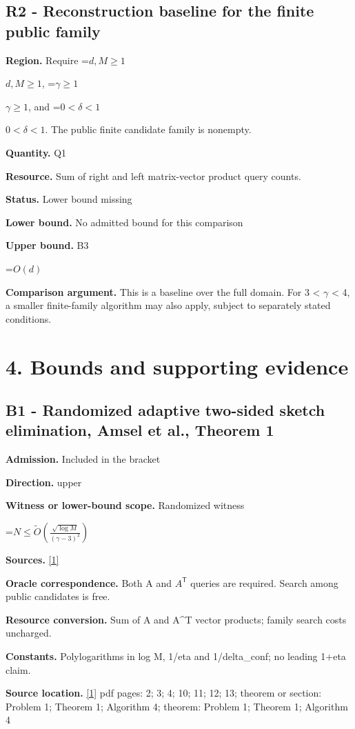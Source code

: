 \documentclass[10pt,a4paper]{article}
\newcommand{\AtlasMath}[1]{\par\begingroup\centering\setbox0=\hbox{$\displaystyle #1$}\ifdim\wd0>1.4\linewidth\typeout{ATLAS WIDE FORMULA: \the\wd0}\fi\ifdim\wd0>\linewidth\resizebox{\linewidth}{!}{\box0}\else\box0\fi\par\endgroup}
\newcommand{\AtlasInlineMath}[1]{\begingroup\setbox0=\hbox{$#1$}\ifdim\wd0>.4\linewidth\endgroup\AtlasMath{#1}\else\endgroup$#1$\fi}
\begin{document}
\subsection{R2 - Reconstruction baseline for the finite public family}
\textbf{Region.} Require \AtlasInlineMath{d,M\ge1}, \AtlasInlineMath{\gamma\ge1}, and \AtlasInlineMath{0<\delta<1}. The public finite candidate family is nonempty.

\textbf{Quantity.} Q1

\textbf{Resource.} Sum of right and left matrix-vector product query counts.

\textbf{Status.} Lower bound missing

\textbf{Lower bound.} No admitted bound for this comparison

\textbf{Upper bound.} B3

\AtlasMath{O(d)}
\textbf{Comparison argument.} This is a baseline over the full domain. For 3 < $\gamma$ < 4, a smaller finite-family algorithm may also apply, subject to separately stated conditions.

\section{4. Bounds and supporting evidence}
\subsection{B1 - Randomized adaptive two-sided sketch elimination, Amsel et al., Theorem 1}
\textbf{Admission.} Included in the bracket

\textbf{Direction.} upper

\textbf{Witness or lower-bound scope.} Randomized witness

\AtlasMath{N\le\widetilde{O}\!\left(\frac{\sqrt{\log M}}{(\gamma-3)^2}\right)}
\textbf{Sources.} \href{https://raw.githubusercontent.com/mlresearch/v336/main/assets/amsel26a/amsel26a.pdf}{[1]}

\textbf{Oracle correspondence.} Both A and $A^{\mathsf T}$ queries are required. Search among public candidates is free.

\textbf{Resource conversion.} Sum of A and A\textasciicircum{}T vector products; family search costs uncharged.

\textbf{Constants.} Polylogarithms in log M, 1/eta and 1/delta\_conf; no leading 1+eta claim.

\textbf{Source location.} \href{https://raw.githubusercontent.com/mlresearch/v336/main/assets/amsel26a/amsel26a.pdf}{[1]} pdf pages: 2; 3; 4; 10; 11; 12; 13; theorem or section: Problem 1; Theorem 1; Algorithm 4; theorem: Problem 1; Theorem 1; Algorithm 4
\end{document}
